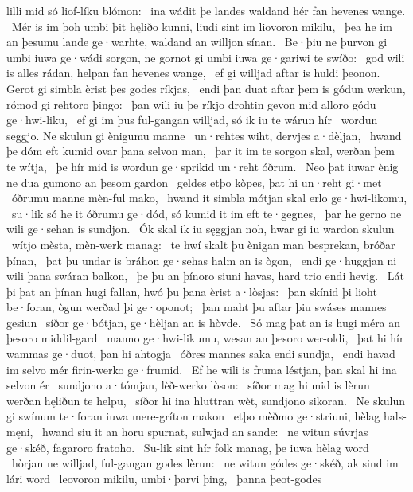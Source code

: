 lilli mid só liof-líku blómon: \hld\ ina wádit þe landes waldand
hér fan hevenes wange. \hld\ Mér is im þoh umbi þit hęliðo kunni,
liudi sint im liovoron mikilu, \hld\ þea he im an þesumu lande ge·warhte,
waldand an willjon sínan. \hld\ Be·þiu ne þurvon gi umbi iuwa ge·wádi sorgon,
ne gornot gi umbi iuwa ge·gariwi te swíðo: \hld\ god wili is alles rádan,
helpan fan hevenes wange, \hld\ ef gi willjad aftar is huldi þeonon.
Gerot gi simbla èrist þes godes ríkjas, \hld\ endi þan duat aftar þem is gódun werkun,
rómod gi rehtoro þingo: \hld\ þan wili iu þe ríkjo drohtin
gevon mid alloro gódu ge·hwi-liku, \hld\ ef gi im þus ful-gangan willjad,
só ik iu te wárun hír \hld\ wordun seggjo.
Ne skulun gi ènigumu manne \hld\ un·rehtes wiht,
dervjes a·dèljan, \hld\ hwand þe dóm eft kumid
ovar þana selvon man, \hld\ þar it im te sorgon skal,
werðan þem te wítja, \hld\ þe hír mid is wordun ge·sprikid
un·reht óðrum. \hld\ Neo þat iuwar ènig ne dua
gumono an þesom gardon \hld\ geldes etþo kòpes,
þat hi un·reht gi·met \hld\ óðrumu manne
mèn-ful mako, \hld\ hwand it simbla mótjan skal
erlo ge·hwi-likomu, \hld\ su·lik só he it óðrumu ge·dód,
só kumid it im eft te·gegnes, \hld\ þar he gerno ne wili
ge·sehan is sundjon. \hld\ Ók skal ik iu sęggjan noh,
hwar gi iu wardon skulun \hld\ wítjo mèsta,
mèn-werk manag: \hld\ te hwí skalt þu ènigan man besprekan,
bróðar þínan, \hld\ þat þu undar is bráhon ge·sehas
halm an is ògon, \hld\ endi ge·huggjan ni wili
þana swáran balkon, \hld\ þe þu an þínoro siuni havas,
hard trio endi hevig. \hld\ Lát þi þat an þínan hugi fallan,
hwó þu þana èrist a·lòsjas: \hld\ þan skínid þi lioht be·foran,
ògun werðad þi ge·oponot; \hld\ þan maht þu aftar þiu
swáses mannes gesiun \hld\ síðor ge·bótjan,
ge·hèljan an is hòvde. \hld\ Só mag þat an is hugi méra
an þesoro middil-gard \hld\ manno ge·hwi-likumu,
wesan an þesoro wer-oldi, \hld\ þat hi hír wammas ge·duot,
þan hi ahtogja \hld\ óðres mannes
saka endi sundja, \hld\ endi havad im selvo mér
firin-werko ge·frumid. \hld\ Ef he wili is fruma léstjan,
þan skal hi ina selvon ér \hld\ sundjono a·tómjan,
lèð-werko lòson: \hld\ síðor mag hi mid is lèrun werðan
hęliðun te helpu, \hld\ síðor hi ina hluttran wèt,
sundjono sikoran. \hld\ Ne skulun gi swínum te·foran
iuwa mere-gríton makon \hld\ etþo mèðmo ge·striuni,
hèlag hals-męni, \hld\ hwand siu it an horu spurnat,
sulwjad an sande: \hld\ ne witun súvrjas ge·skéð,
fagaroro fratoho. \hld\ Su-lik sint hír folk manag,
þe iuwa hèlag word \hld\ hòrjan ne willjad,
ful-gangan godes lèrun: \hld\ ne witun gódes ge·skéð,
ak sind im lári word \hld\ leovoron mikilu,
umbi·þarvi þing, \hld\ þanna þeot-godes
